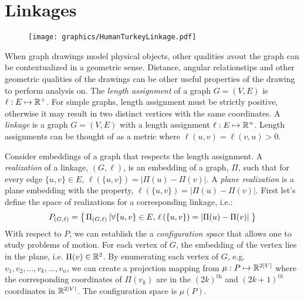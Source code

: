 \section{Linkages}
\begin{figure}[!htbp]
 \begin{center}
  \texttt{[image: graphics/HumanTurkeyLinkage.pdf]}
 \end{center}
\end{figure}

When graph drawings model physical objects, other qualities avout the graph can be contextualized in a geometric sense.  
Distance, angular relationstips and other geometric qualities of the drawings can be other useful properties of the drawing to perform analysis on.
The \textit{length assignment} of a graph $G=(V,E)$ is $\ell:E \mapsto {\mathbb{R}}^+$. 
For simple graphs, length assignment must be strictly positive, otherwise it may result in two distinct vertices with the same coordinates.
A \textit{linkage} is a graph $G = (V,E)$ with a length assignment $\ell:E \mapsto {\mathbb{R}}^+$.  
Length assignments can be thought of as a metric where $\ell(u,v) = \ell(v,u)>0$.

Consider embeddings of a graph that respects the length assignment.  
A \textit{realization} of a linkage, $(G,\ell)$, is an embedding of a graph, $\Pi$, such that for every edge $\{u,v\} \in E$, $\ell\left( \{u,v\} \right) = \left\vert \Pi(u) - \Pi(v) \right\vert$.  
A \textit{plane realization} is a plane embedding with the property, $\ell\left( \{u,v\} \right) = \left\vert \Pi(u) - \Pi(v) \right\vert$.
First let's define the space of realizations for a corresponding linkage, i.e.:
$$P_{(G,\ell)} = {\left\lbrace \left. \Pi_{(G,\ell)} \left\vert \forall \{u,v\} \in E\text{, }\ell\left( \{u,v\} \right) = \left\vert \Pi(u) - \Pi(v) \right\vert \right.\right.\right\rbrace }$$
With respect to $P$, we can establish the a \textit{configuration space} that allows one to study problems of motion.  For each vertex of $G$, the embedding of the vertex lies in the plane, i.e. $\Pi(v) \in {\mathbb{R}}^2$.  By enumerating each vertex of $G$, e.g. $v_1, v_2, \dots, v_k, \dots, v_{n}$, we can create a projection mapping from $\mu: P \mapsto {\mathbb{R}}^{2\vert V \vert}$ where the corresponding coordinates of $\Pi(v_k)$ are in the $(2k)^\text{th}$ and $(2k+1)^{th}$ coordinates in ${\mathbb{R}}^{2\vert V \vert}$.  The configuration space is $\mu(P)$.  

